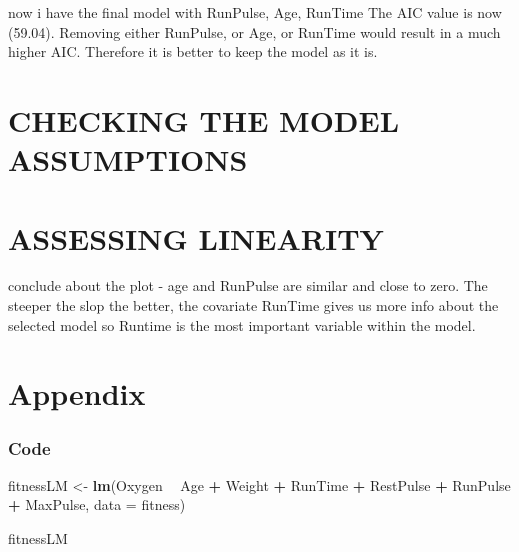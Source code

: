 \documentclass[]{article}
\newenvironment{Shaded}{\begin{snugshade}}{\end{snugshade}}
\newcommand{\KeywordTok}[1]{\textcolor[rgb]{0.13,0.29,0.53}{\textbf{#1}}}
\newcommand{\DataTypeTok}[1]{\textcolor[rgb]{0.13,0.29,0.53}{#1}}
\newcommand{\StringTok}[1]{\textcolor[rgb]{0.31,0.60,0.02}{#1}}
\newcommand{\OperatorTok}[1]{\textcolor[rgb]{0.81,0.36,0.00}{\textbf{#1}}}
\newcommand{\NormalTok}[1]{#1}
\begin{document}
now i have the final model with RunPulse, Age, RunTime The AIC value is
now (59.04). Removing either RunPulse, or Age, or RunTime would result
in a much higher AIC. Therefore it is better to keep the model as it is.

\section{CHECKING THE MODEL
ASSUMPTIONS}\label{checking-the-model-assumptions}

\section{ASSESSING LINEARITY}\label{assessing-linearity}

conclude about the plot - age and RunPulse are similar and close to
zero. The steeper the slop the better, the covariate RunTime gives us
more info about the selected model so Runtime is the most important
variable within the model.

\section{Appendix}\label{appendix}

\subsubsection{Code}\label{code}

\begin{Shaded}
\begin{Highlighting}[]
\NormalTok{fitnessLM <-}\StringTok{ }\KeywordTok{lm}\NormalTok{(Oxygen }\OperatorTok{~}\StringTok{ }\NormalTok{Age }\OperatorTok{+}\StringTok{ }\NormalTok{Weight }\OperatorTok{+}\StringTok{ }\NormalTok{RunTime }\OperatorTok{+}\StringTok{ }\NormalTok{RestPulse }\OperatorTok{+}\StringTok{ }\NormalTok{RunPulse }\OperatorTok{+}\StringTok{ }\NormalTok{MaxPulse, }
                \DataTypeTok{data =}\NormalTok{ fitness)}

\NormalTok{fitnessLM}
\end{Highlighting}
\end{Shaded}
\end{document}
